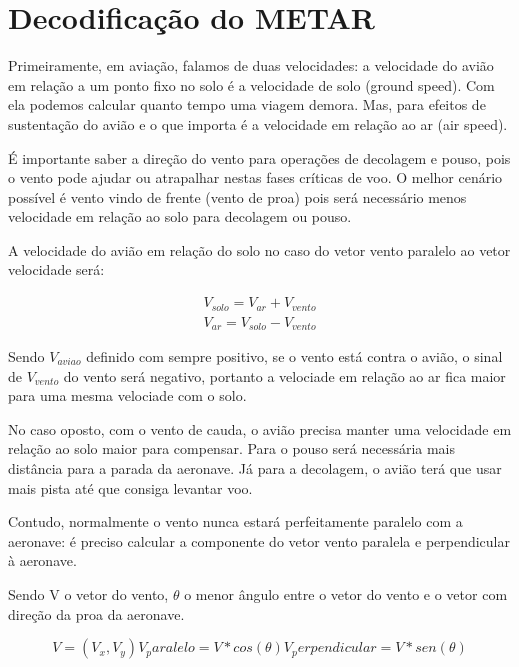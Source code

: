 \chapter{Decodificação do METAR}

Primeiramente, em aviação, falamos de duas velocidades: a velocidade do avião
 em relação a um ponto fixo no solo é a velocidade de solo (ground speed).
Com ela podemos calcular quanto tempo uma viagem demora. Mas, para efeitos de 
sustentação do avião e o que importa é a velocidade em relação ao ar (air speed). 

É importante saber a direção do vento para operações de decolagem e pouso,
pois o vento pode ajudar ou atrapalhar nestas fases críticas de voo.
O melhor cenário possível é vento vindo de frente (vento de proa) pois
será necessário menos velocidade em relação ao solo para decolagem ou 
pouso.

A velocidade do avião em relação do solo no caso do vetor vento 
paralelo ao vetor velocidade será:

\begin{align}
    V_{solo} = V_{ar} + V_{vento} \\
    V_{ar} = V_{solo} - V_{vento}
\end{align}

Sendo $V_{aviao}$ definido com sempre positivo, se o vento está 
contra o avião, o sinal de $V_{vento}$ do vento
será negativo, portanto a velociade em relação ao ar fica maior para
uma mesma velociade com o solo.

No caso oposto, com o vento de cauda, o avião precisa manter uma
velocidade em relação ao solo maior para compensar. Para o 
pouso será necessária mais distância para a parada da aeronave.
Já para a decolagem, o avião terá que usar mais pista até que
consiga levantar voo.

Contudo, normalmente o vento nunca estará perfeitamente paralelo
com a aeronave: é preciso calcular a componente do vetor vento 
paralela e perpendicular à aeronave.

Sendo V o vetor do vento, $\theta$ o menor ângulo entre o vetor 
do vento e o vetor com direção da proa da aeronave.


\begin{equation}
V = (V_x, V_y)
V_paralelo = V * cos(\theta)
V_perpendicular = V * sen(\theta)
\end{equation}

